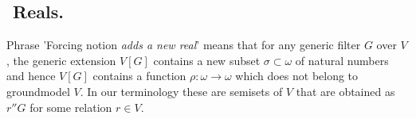 
\subsection{${}$ \hspace{-1em}Reals.}
Phrase 'Forcing notion \emph{adds a new real}' means that for
any generic filter $G$ over $V$, the generic extension $V[G]$
contains a new subset $\sigma \subset \omega$ of natural numbers
and hence $V[G]$ contains a function $\rho: \omega \to \omega$ which does
not belong to groundmodel $V$. In our terminology these are
semisets of $V$ that are obtained as $r''G$ for some
relation $r \in V$.


